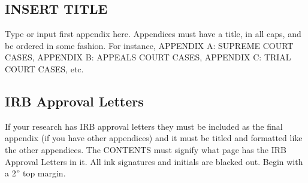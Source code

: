 \documentclass[dissertation]{uathesis-2024}
\begin{document}
\begin{body}
 \begingroup
 \topskip=1in



 \endgroup



\begin{appendices}
\renewcommand{\appendixname}{APPENDIX}

\chapter{INSERT TITLE}
Type or input{} first appendix here. Appendices must have a title, in all caps, and be ordered in some fashion.  For instance, APPENDIX A: SUPREME COURT CASES, APPENDIX B: APPEALS COURT CASES, APPENDIX C: TRIAL COURT CASES, etc. 

\section{IRB Approval Letters}
If your research has IRB approval letters they must be included as the final appendix (if you have other appendices) and it must be titled and formatted like the other appendices. The CONTENTS must signify what page has the IRB Approval Letters in it.
All ink signatures and initials are blacked out. Begin with a 2” top margin.

\end{appendices}

\end{body}
\end{document}
